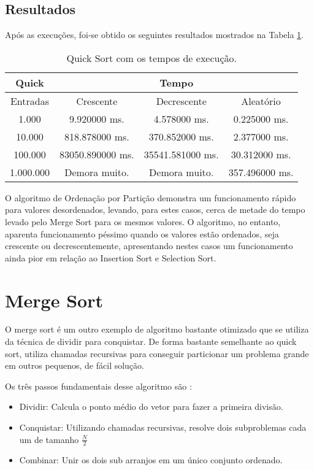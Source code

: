 \documentclass[
	12pt,				%
	openany,
	a4paper,			%
	english,			%
	french,				%
	spanish,			%
	brazil,				%
	]{abntex2}
\begin{document}
	\subsection{Resultados}
   	Após as execuções, foi-se obtido os seguintes resultados mostrados na Tabela \ref{tab:quick}.
   	
   	\begin{table}[H]
\centering
\begin{tabular}{|c|c|c|c|}
\hline
Quick     & \multicolumn{3}{c|}{Tempo}                           \\ \hline
Entradas  & Crescente        & Decrescente      & Aleatório      \\ \hline
1.000     & 9.920000 ms.     & 4.578000 ms.     & 0.225000 ms.   \\ \hline
10.000    & 818.878000 ms.   & 370.852000 ms.   & 2.377000 ms.   \\ \hline
100.000   & 83050.890000 ms. & 35541.581000 ms. & 30.312000 ms.  \\ \hline
1.000.000 & Demora muito.    & Demora muito.    & 357.496000 ms. \\ \hline
\end{tabular}
\caption{Quick Sort com os tempos de execução.}
\label{tab:quick}
\end{table}
	
	O algoritmo de Ordenação por Partição demonstra um funcionamento rápido para valores desordenados, levando, para estes casos, cerca de metade do tempo levado pelo Merge Sort para os mesmos valores.
	O algoritmo, no entanto, aparenta funcionamento péssimo quando os valores estão ordenados, seja crescente ou decrescentemente, apresentando nestes casos um funcionamento ainda pior em relação ao Insertion Sort e Selection Sort.
	
	
	\section{Merge Sort}
	O merge sort é um outro exemplo de algoritmo bastante otimizado que se utiliza da técnica de dividir para conquistar. De forma bastante semelhante ao quick sort, utiliza chamadas recursivas para conseguir particionar um problema grande em outros pequenos, de fácil solução.
	
	Os três passos fundamentais desse algoritmo são : 
	
	\begin{itemize}
		\item Dividir: Calcula o ponto médio do vetor para fazer a primeira divisão.
		\item Conquistar: Utilizando chamadas recursivas, resolve dois subproblemas cada um de tamanho $\frac{N}{2}$
		\item Combinar: Unir os dois sub arranjos em um único conjunto ordenado.
	\end{itemize}
	
\end{document}
